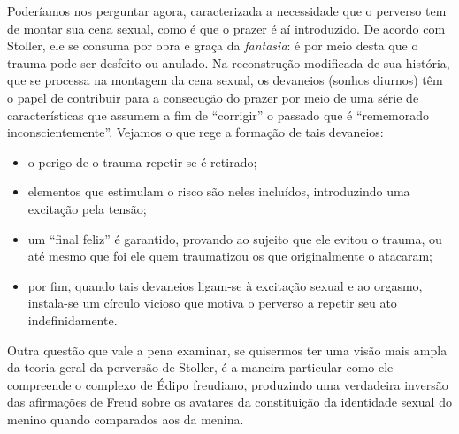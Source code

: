 Poderíamos nos perguntar agora, caracterizada a necessidade que o
perverso tem de montar sua cena sexual, como é que o prazer é aí
introduzido. De acordo com Stoller, ele se consuma por obra e graça da
\emph{fantasia}: é por meio desta que o trauma pode ser desfeito ou
anulado. Na reconstrução modificada de sua história, que se processa na
montagem da cena sexual, os devaneios (sonhos diurnos) têm o papel de
contribuir para a consecução do prazer por meio de uma série de
características que assumem a fim de ``corrigir'' o passado que é
``rememorado inconscientemente''. Vejamos o que rege a formação de tais
devaneios:

\begin{itemize}
\item
  o perigo de o trauma repetir-se é retirado;
\item
  elementos que estimulam o risco são neles incluídos, introduzindo uma
  excitação pela tensão;
\item
  um ``final feliz'' é garantido, provando ao sujeito que ele evitou o
  trauma, ou até mesmo que foi ele quem traumatizou os que originalmente
  o atacaram;
\item
  por fim, quando tais devaneios ligam-se à excitação sexual e ao
  orgasmo, instala-se um círculo vicioso que motiva o perverso a repetir
  seu ato indefinidamente.
\end{itemize}

Outra questão que vale a pena examinar, se quisermos ter uma visão mais
ampla da teoria geral da perversão de Stoller, é a maneira particular
como ele compreende o complexo de Édipo freudiano, produzindo uma
verdadeira inversão das afirmações de Freud sobre os avatares da
constituição da identidade sexual do menino quando comparados aos da
menina.

